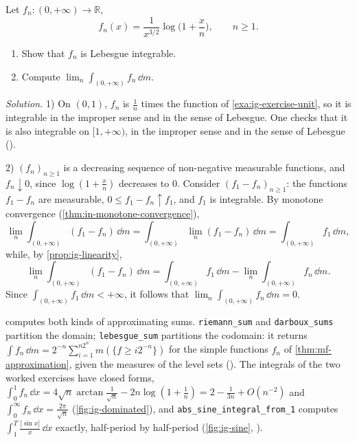 \begin{example}\label{exa:ig-exercise-halfline}
Let $f_n:(0,+\infty)\to\mathbb R$,
\[
  f_n(x)=\frac1{x^{3/2}}\log\Big(1+\frac xn\Big),\qquad n\ge1 .
\]
\begin{enumerate}[label=\arabic*)]
  \item Show that $f_n$ is Lebesgue integrable.
  \item Compute $\lim_n\int_{(0,+\infty)}f_n\,\dd m$.
\end{enumerate}

\emph{Solution.} 1) On $(0,1)$, $f_n$ is $\frac1n$ times the function of
\cref{exa:ig-exercise-unit}, so it is integrable in the improper sense and in the sense of
Lebesgue. One checks that it is also integrable on $[1,+\infty)$, in the improper sense and in
the sense of Lebesgue ().

2) $(f_n)_{n\ge1}$ is a decreasing sequence of non-negative measurable functions, and
$f_n\downarrow0$, since $\log(1+\frac xn)$ decreases to $0$. Consider $(f_1-f_n)_{n\ge1}$: the
functions $f_1-f_n$ are measurable, $0\le f_1-f_n\uparrow f_1$, and $f_1$ is integrable. By
monotone convergence (\cref{thm:in-monotone-convergence}),
\[
  \lim_n\int_{(0,+\infty)}(f_1-f_n)\,\dd m=\int_{(0,+\infty)}\lim_n(f_1-f_n)\,\dd m
  =\int_{(0,+\infty)}f_1\,\dd m,
\]
while, by \cref{prop:ig-linearity},
\[
  \lim_n\int_{(0,+\infty)}(f_1-f_n)\,\dd m=\int_{(0,+\infty)}f_1\,\dd m-\lim_n\int_{(0,+\infty)}f_n\,\dd m .
\]
Since $\int_{(0,+\infty)}f_1\,\dd m<+\infty$, it follows that
$\lim_n\int_{(0,+\infty)}f_n\,\dd m=0$.
\end{example}

\begin{remark}[Computational]\label{rem:ig-riemann-code}
 computes both kinds of approximating sums.
\texttt{riemann\_sum} and \texttt{darboux\_sums} partition the domain; \texttt{lebesgue\_sum}
partitions the codomain: it returns $\int f_n\,\dd m=2^{-n}\sum_{i=1}^{n2^n}m(\{f\ge i2^{-n}\})$
for the simple functions $f_n$ of \cref{thm:mf-approximation}, given the measures of the level
sets (). The integrals of the two worked exercises have closed
forms, $\int_0^1f_n\,\dd x=4\sqrt n\arctan\frac1{\sqrt n}-2n\log(1+\frac1n)=2-\frac1{3n}+O(n^{-2})$
and $\int_0^\infty f_n\,\dd x=\frac{2\pi}{\sqrt n}$ (\cref{fig:ig-dominated}), and
\texttt{abs\_sine\_integral\_from\_1} computes $\int_1^T\frac{|\sin x|}x\,\dd x$ exactly, half-period
by half-period (\cref{fig:ig-sine}, ).
\end{remark}

